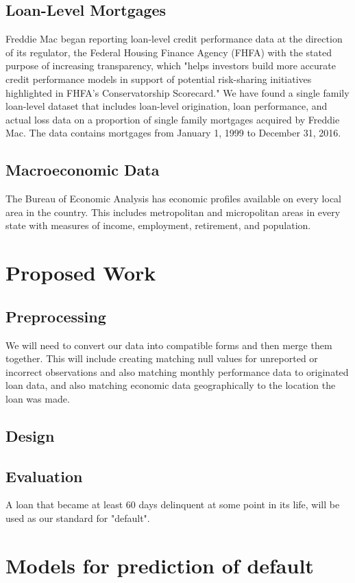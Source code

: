 \documentclass[sigconf, 11pt]{acmart}
\begin{document}
\subsection{Loan-Level Mortgages}
Freddie Mac began reporting loan-level credit performance data at the direction of its regulator, the Federal Housing Finance Agency (FHFA) with the stated purpose of increasing transparency, which "helps investors build more accurate credit performance models in support of potential risk-sharing initiatives highlighted in FHFA's Conservatorship Scorecard." We have found a single family loan-level dataset that includes loan-level origination, loan performance, and actual loss data on a proportion of single family mortgages acquired by Freddie Mac. The data contains mortgages from January 1, 1999 to December 31, 2016. 
\subsection{Macroeconomic Data}
The Bureau of Economic Analysis has economic profiles available on every local area in the country. This includes metropolitan and micropolitan areas in every state with measures of income, employment, retirement, and population. 

\section{Proposed Work}
\subsection{Preprocessing}
We will need to convert our data into compatible forms and then merge them together. This will include creating matching null values for unreported or incorrect observations and also matching monthly performance data to originated loan data, and also matching economic data geographically to the location the loan was made.
\subsection{Design}
\subsection{Evaluation}
A loan that became at least 60 days delinquent at some point in its life, will be used as our standard for "default".

\section{Models for prediction of default}
\end{document}
